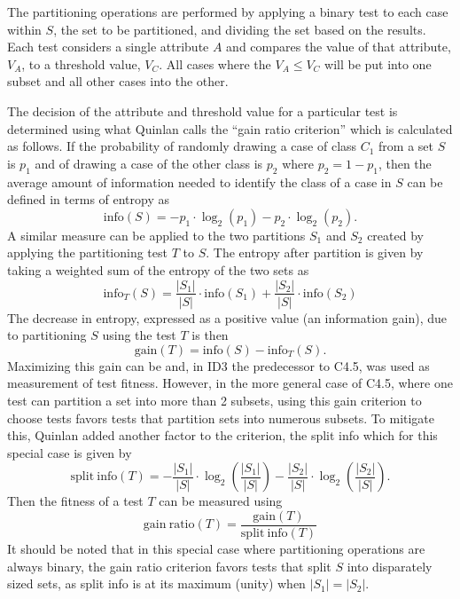 \documentclass[main.tex]{subfiles}
\begin{document}
The partitioning operations are performed by applying a binary test to each case within $S$, the set to be partitioned, and dividing the set based on the results. Each test considers a single attribute $A$ and compares the value of that attribute, $V_A$, to a threshold value, $V_C$. All cases where the $V_A\leq V_C$ will be put into one subset and all other cases into the other.

The decision of the attribute and threshold value for a particular test is determined using what Quinlan calls the ``gain ratio criterion'' which is calculated as follows. If the probability of randomly drawing a case of class $C_1$ from a set $S$ is $p_1$ and of drawing a case of the other class is $p_2$ where $p_2 = 1-p_1$, then the average amount of information needed to identify the class of a case in $S$ can be defined in terms of entropy as
\[
\mathrm{info}(S)=-p_1 \cdot \log_2(p_1) - p_2 \cdot \log_2(p_2).
\]
A similar measure can be applied to the two partitions $S_1$ and $S_2$ created by applying the partitioning test $T$ to $S$. The entropy after partition is given by taking a weighted sum of the entropy of the two sets as
\[
\mathrm{info}_T(S)=\frac{|S_1|}{|S|} \cdot \mathrm{info}(S_1) + \frac{|S_2|}{|S|} \cdot \mathrm{info}(S_2)
\]
The decrease in entropy, expressed as a positive value (an information gain), due to partitioning $S$ using the test $T$ is then
\[
\mathrm{gain}(T)=\mathrm{info}(S)-\mathrm{info}_T(S).
\]
Maximizing this gain can be and, in ID3 the predecessor to C4.5, was used as measurement of test fitness. However, in the more general case of C4.5, where one test can partition a set into more than 2 subsets, using this gain criterion to choose tests favors tests that partition sets into numerous subsets. To mitigate this, Quinlan added another factor to the criterion, the split info which for this special case is given by
\[
\mathrm{split\ info}(T)= -\frac{|S_1|}{|S|} \cdot \log_2 \left( \frac{|S_1|}{|S|} \right) - \frac{|S_2|}{|S|} \cdot \log_2  \left( \frac{|S_2|}{|S|}  \right).
\]
Then the fitness of a test $T$ can be measured using
\[
\mathrm{gain\ ratio}(T) = \frac{\mathrm{gain}(T)}{\mathrm{split\ info}(T)}
\]
It should be noted that in this special case where partitioning operations are always binary, the gain ratio criterion favors tests that split $S$ into disparately sized sets, as split info is at its maximum (unity) when $|S_1|=|S_2|$.
\end{document}
